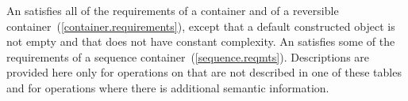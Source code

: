 \pnum
{}%
An  satisfies all of the requirements of a container and
of a reversible container~(\ref{container.requirements}), except that a default
constructed  object is not empty and that  does not have constant
complexity. An  satisfies some of the requirements of a sequence
container~(\ref{sequence.reqmts}).
Descriptions are provided here
only for operations on  that are not described in
one of these tables and
for operations where there is additional semantic information.

%
%
%
%
%
%
%
%
%
